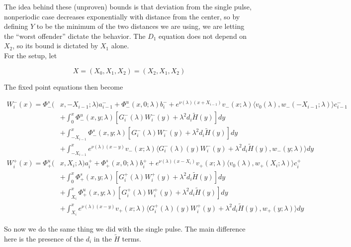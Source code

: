 \documentclass[12pt]{article}
\begin{document}
The idea behind these (unproven) bounds is that deviation from the single pulse, nonperiodic case decreases exponentially with distance from the center, so by defining $Y$ to be the minimum of the two distances we are using, we are letting the ``worst offender'' dictate the behavior. The $D_1$ equation does not depend on $X_2$, so its bound is dictated by $X_1$ alone.\\

For the setup, let

\[
X = (X_0, X_1, X_2) = (X_2, X_1, X_2)
\]

The fixed point equations then become

\begin{align*}
W_i^-(x) = \Phi^s_-(&x, -X_{i-1}; \lambda)a_{i-1}^- + \Phi^u_-(x, 0; \lambda)b_i^- + e^{\nu(\lambda)(x+X_{i-1})} v_-(x; \lambda) \langle v_0(\lambda), w_-(-X_{i-1}; \lambda) \rangle c_{i-1}^- \\
&+ \int_0^x \Phi^u_-(x, y; \lambda)[ G_i^-(\lambda)W_i^-(y) + \lambda^2 d_i \tilde{H}(y) ] dy \\
&+ \int_{-X_{i-1}}^x \Phi^s_-(x, y; \lambda) [ G_i^-(\lambda)W_i^-(y) + \lambda^2 d_i \tilde{H}(y) ] dy \\
&+ \int_{-X_{i-1}}^x 
e^{\nu(\lambda)(x-y)} v_-(x; \lambda) \langle G_i^-(\lambda)(y)W_i^-(y) + \lambda^2 d_i \tilde{H}(y), w_-(y; \lambda) \rangle dy \\
W_i^+(x) = \Phi^u_+(&x, X_i; \lambda)a_i^+ + \Phi^s_+(x, 0; \lambda)b_i^+ + e^{\nu(\lambda)(x - X_i)} v_+(x; \lambda) \langle v_0(\lambda), w_+(X_i; \lambda) \rangle c_i^+ \\
&+ \int_0^x \Phi^s_+(x, y; \lambda) [ G_i^+(\lambda)W_i^+(y) + \lambda^2 d_i \tilde{H}(y) ] dy \\
&+ \int_{X_i}^x \Phi^u_+(x, y; \lambda) [ G_i^+(\lambda)W_i^+(y) + \lambda^2 d_i \tilde{H}(y) ] dy \\
&+ \int_{X_i}^x e^{\nu(\lambda)(x-y)} v_+(x; \lambda) \langle G_i^+(\lambda)(y)W_i^+(y) + \lambda^2 d_i \tilde{H}(y), w_+(y; \lambda) \rangle dy
\end{align*}

So now we do the same thing we did with the single pulse. The main difference here is the presence of the $d_i$ in the $\tilde{H}$ terms. 
\end{document}
